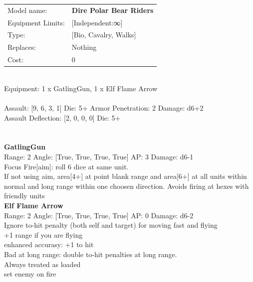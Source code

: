 \noindent
\begin{tabular}{ll}
Model name: &{\bf Dire Polar Bear Riders } \\
Equipment Limits: &[Independent:∞] \\
Type: &[Bio, Cavalry, Walks] \\
Replaces: &Nothing \\
Cost: & 0\\
\end{tabular}
\ \\
Equipment: 1 x GatlingGun, 1 x Elf Flame Arrow \\
\ \\
Assault: [9, 6, 3, 1] Die: 5+ Armor Penetration: 2 Damage: d6+2 \\
Assault Deflection: [2, 0, 0, 0] Die: 5+\\
\indent  
\ \\

\ \\
{\bf GatlingGun } \\



Range: 2  Angle: [True, True, True, True] AP: 3 Damage: d6-1 \\
Focus Fire[aim]: roll 6 dice at same unit.\\ 
If not using aim, area[4+] at point blank range and area[6+] at all units within normal and long range within one choosen direction. Avoids firing at hexes with friendly units\\ 




{\bf Elf Flame Arrow } \\



Range: 2  Angle: [True, True, True, True] AP: 0 Damage: d6-2 \\
Ignore to-hit penalty (both self and target) for moving fast and flying\\ 
+1 range if you are flying\\ 
enhanced accurasy: +1 to hit\\ 
Bad at long range: double to-hit penalties at long range.\\ 
Always treated as loaded\\ 
set enemy on fire\\ 




 
\ \\













